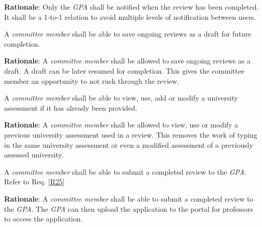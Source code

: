 \documentclass[fontsize=12pt,paper=letter,twoside]{scrartcl}
\begin{document}
\smallskip
\noindent \textbf{Rationale}: Only the \emph{GPA} shall be notified when the review has been completed. It shall be a 1-to-1 relation to avoid multiple levels of notification between users.

\genreq
{A \emph{committee member} shall be able to save ongoing reviews as a draft for future completion.\\}
{}
\label{R26}

\smallskip
\noindent \textbf{Rationale}: A \emph{committee member} shall be allowed to save ongoing reviews as a draft. A draft can be later resumed for completion. This gives the committee member an opportunity to not rush through the review.

\genreq
{A \emph{committee member} shall be able to view, use, add or modify a university assessment if it has already been provided.\\}
{}
\label{R27}

\smallskip
\noindent \textbf{Rationale}: A \emph{committee member} shall be allowed to view, use or modify a previous university assessment used in a review. This removes the work of typing in the same university assessment or even a modified assessment of a previously assessed university.

\rdescription
{A \emph{committee member} shall be able to submit a completed review to the \emph{GPA}.\\}
{Refer to Req. \ref{R25}}
\label{R28}

\smallskip
\noindent \textbf{Rationale}: A \emph{committee member} shall be able to submit a completed review to the \emph{GPA}. The \emph{GPA} can then upload the application to the portal for professors to access the application.
\end{document}

